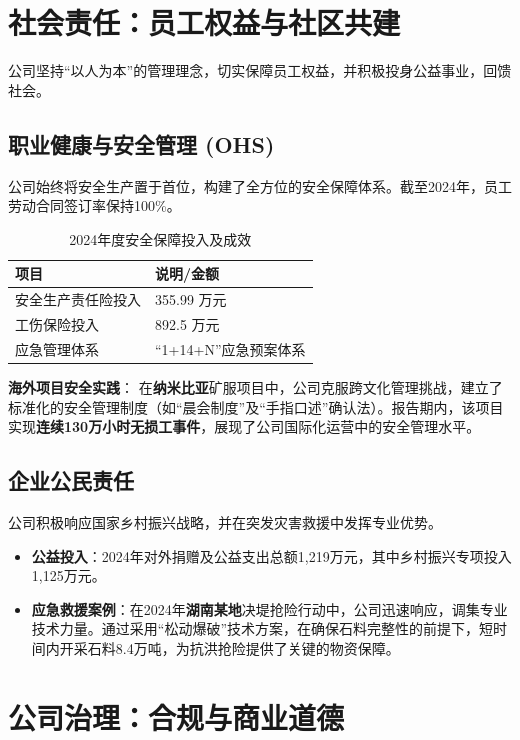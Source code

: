 \documentclass[a4paper,12pt]{article}
\begin{document}
\section{社会责任：员工权益与社区共建}

公司坚持“以人为本”的管理理念，切实保障员工权益，并积极投身公益事业，回馈社会。

\subsection{职业健康与安全管理 (OHS)}

公司始终将安全生产置于首位，构建了全方位的安全保障体系。截至2024年，员工劳动合同签订率保持100\%。

\begin{table}[H]
\centering
\caption{2024年度安全保障投入及成效}
\begin{tabular}{@{}ll@{}}
\toprule
\textbf{项目} & \textbf{说明/金额} \\ \midrule
安全生产责任险投入 & 355.99 万元 \\
工伤保险投入 & 892.5 万元 \\
应急管理体系 & “1+14+N”应急预案体系 \\ \bottomrule
\end{tabular}
\end{table}

\textbf{海外项目安全实践}：
在\textbf{纳米比亚}矿服项目中，公司克服跨文化管理挑战，建立了标准化的安全管理制度（如“晨会制度”及“手指口述”确认法）。报告期内，该项目实现\textbf{连续130万小时无损工事件}，展现了公司国际化运营中的安全管理水平。

\subsection{企业公民责任}

公司积极响应国家乡村振兴战略，并在突发灾害救援中发挥专业优势。

\begin{itemize}
    \item \textbf{公益投入}：2024年对外捐赠及公益支出总额1,219万元，其中乡村振兴专项投入1,125万元。
    \item \textbf{应急救援案例}：在2024年\textbf{湖南某地}决堤抢险行动中，公司迅速响应，调集专业技术力量。通过采用“松动爆破”技术方案，在确保石料完整性的前提下，短时间内开采石料8.4万吨，为抗洪抢险提供了关键的物资保障。
\end{itemize}

\section{公司治理：合规与商业道德}
\end{document}
